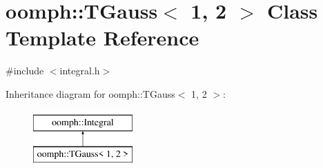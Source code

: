 \hypertarget{classoomph_1_1TGauss_3_011_00_012_01_4}{}\section{oomph\+:\+:T\+Gauss$<$ 1, 2 $>$ Class Template Reference}
\label{classoomph_1_1TGauss_3_011_00_012_01_4}


{\ttfamily \#include $<$integral.\+h$>$}

Inheritance diagram for oomph\+:\+:T\+Gauss$<$ 1, 2 $>$\+:\begin{figure}[H]
\begin{center}
\leavevmode
\includegraphics[height=2.000000cm]{classoomph_1_1TGauss_3_011_00_012_01_4}
\end{center}
\end{figure}
